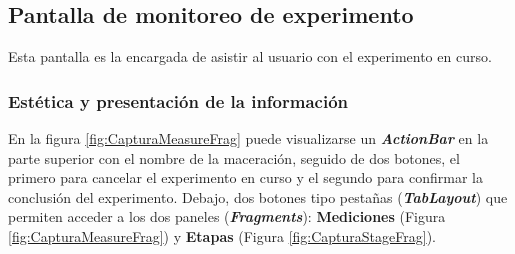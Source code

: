             
            
            
            
        
        \subsection{Pantalla de monitoreo de experimento}
        \label{DescripPantallaMonitoreoExperimento}
        \par Esta pantalla es la encargada de asistir al usuario con el experimento en curso.
        
            \subsubsection{Estética y presentación de la información}
            En la figura \ref{fig:CapturaMeasureFrag} puede visualizarse un \textbf{\textit{\gls{ActionBar}}} en la parte superior con el nombre de la maceración, seguido de dos botones, el primero para cancelar el experimento en curso y el segundo para confirmar la conclusión del experimento. Debajo, dos botones tipo pestañas (\textbf{\textit{\gls{TabLayout}}}) que permiten acceder a los dos paneles (\textbf{\textit{Fragments}}): \textbf{Mediciones} (Figura \ref{fig:CapturaMeasureFrag}) y \textbf{Etapas} (Figura \ref{fig:CapturaStageFrag}).
            
